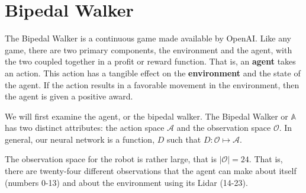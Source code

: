 \documentclass[doc, onecolumn, 12pt]{apa6}
\begin{document}
\newpage
\section{Bipedal Walker}
The Bipedal Walker is a continuous game made available by OpenAI. Like any game, there are two primary components, the environment and the agent, with the two coupled together in a profit or reward function. That is, an \textbf{agent} takes an action. This action has a tangible effect on the \textbf{environment} and the state of the agent. If the action results in a favorable movement in the environment, then the agent is given a positive award. 

We will first examine the agent, or the bipedal walker. The Bipedal Walker or $\mathbb{A}$ has two distinct attributes: the action space $\mathcal{A}$ and the observation space $\mathcal{O}$. In general, our neural network is a function, $D$ such that $D: \mathcal{O} \mapsto \mathcal{A}$.  

The observation space for the robot is rather large, that is $\vert \mathcal{O} \vert = 24$. That is, there are twenty-four different observations that the agent can make about itself (numbers 0-13) and about the environment using its Lidar (14-23).  
\end{document}
